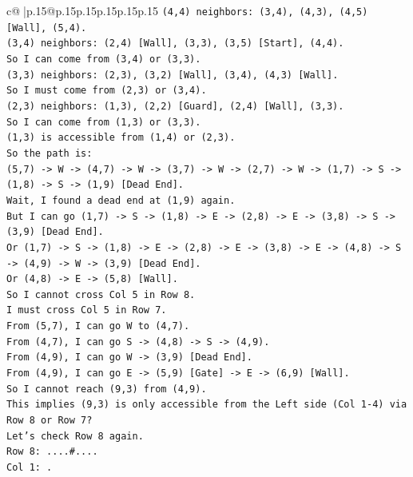 \documentclass{article}
\begin{document}
{\begin{supertabular}{c@{$\;$}|p{.15\linewidth}@{}p{.15\linewidth}p{.15\linewidth}p{.15\linewidth}p{.15\linewidth}p{.15\linewidth}}
{{{\texttt{(4,4) neighbors: (3,4), (4,3), (4,5) {[}Wall{]}, (5,4).} \\
\texttt{(3,4) neighbors: (2,4) {[}Wall{]}, (3,3), (3,5) {[}Start{]}, (4,4).} \\
\texttt{So I can come from (3,4) or (3,3).} \\
\texttt{(3,3) neighbors: (2,3), (3,2) {[}Wall{]}, (3,4), (4,3) {[}Wall{]}.} \\
\texttt{So I must come from (2,3) or (3,4).} \\
\texttt{(2,3) neighbors: (1,3), (2,2) {[}Guard{]}, (2,4) {[}Wall{]}, (3,3).} \\
\texttt{So I can come from (1,3) or (3,3).} \\
\texttt{(1,3) is accessible from (1,4) or (2,3).} \\
\texttt{So the path is:} \\
\texttt{(5,7) {-}> W {-}> (4,7) {-}> W {-}> (3,7) {-}> W {-}> (2,7) {-}> W {-}> (1,7) {-}> S {-}> (1,8) {-}> S {-}> (1,9) {[}Dead End{]}.} \\
\texttt{Wait, I found a dead end at (1,9) again.} \\
\texttt{But I can go (1,7) {-}> S {-}> (1,8) {-}> E {-}> (2,8) {-}> E {-}> (3,8) {-}> S {-}> (3,9) {[}Dead End{]}.} \\
\texttt{Or (1,7) {-}> S {-}> (1,8) {-}> E {-}> (2,8) {-}> E {-}> (3,8) {-}> E {-}> (4,8) {-}> S {-}> (4,9) {-}> W {-}> (3,9) {[}Dead End{]}.} \\
\texttt{Or (4,8) {-}> E {-}> (5,8) {[}Wall{]}.} \\
\texttt{So I cannot cross Col 5 in Row 8.} \\
\texttt{I must cross Col 5 in Row 7.} \\
\texttt{From (5,7), I can go W to (4,7).} \\
\texttt{From (4,7), I can go S {-}> (4,8) {-}> S {-}> (4,9).} \\
\texttt{From (4,9), I can go W {-}> (3,9) {[}Dead End{]}.} \\
\texttt{From (4,9), I can go E {-}> (5,9) {[}Gate{]} {-}> E {-}> (6,9) {[}Wall{]}.} \\
\texttt{So I cannot reach (9,3) from (4,9).} \\
\texttt{This implies (9,3) is only accessible from the Left side (Col 1{-}4) via Row 8 or Row 7?} \\
\texttt{Let's check Row 8 again.} \\
\texttt{Row 8: ....\#....} \\
\texttt{Col 1: .} \\
}}}
\end{supertabular}}
\end{document}
